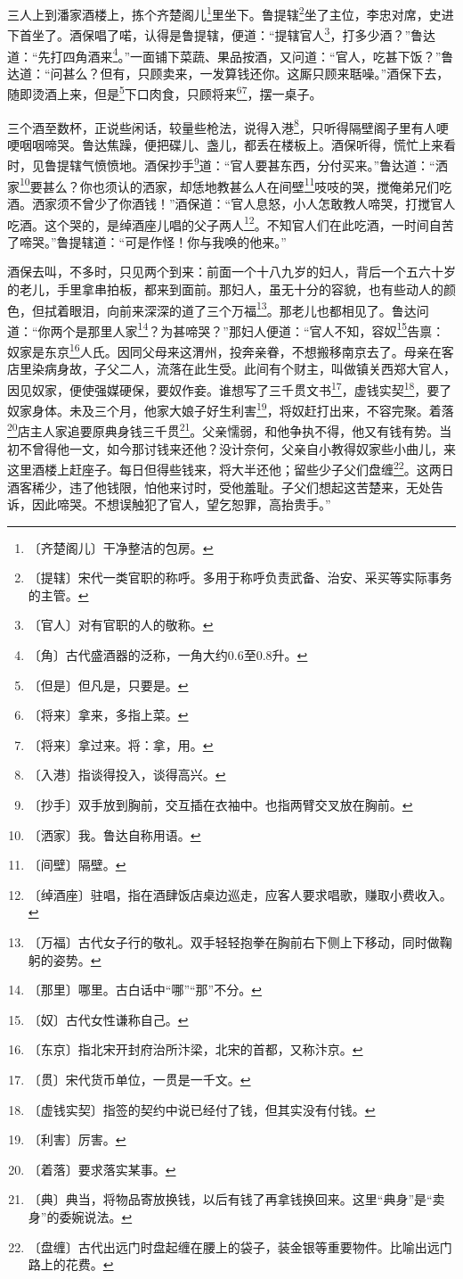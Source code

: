 \documentclass[12pt,UTF-8,openany]{ctexbook}
\begin{document}
\begin{large}
    
    三人上到潘家酒楼上，拣个齐楚阁儿\footnote{〔齐楚阁儿〕干净整洁的包房。}里坐下。鲁提辖\footnote{〔提辖〕宋代一类官职的称呼。多用于称呼负责武备、治安、采买等实际事务的主管。}坐了主位，李忠对席，史进下首坐了。酒保唱了喏，认得是鲁提辖，便道：“提辖官人\footnote{〔官人〕对有官职的人的敬称。}，打多少酒？”鲁达道：“先打四角酒来\footnote{〔角〕古代盛酒器的泛称，一角大约0.6至0.8升。}。”一面铺下菜蔬、果品按酒，又问道：“官人，吃甚下饭？”鲁达道：“问甚么？但有，只顾卖来，一发算钱还你。这厮只顾来聒噪。”酒保下去，随即烫酒上来，但是\footnote{〔但是〕但凡是，只要是。}下口肉食，只顾将来\footnote{〔将来〕拿来，多指上菜。}\footnote{〔将来〕拿过来。将：拿，用。}，摆一桌子。
    
    三个酒至数杯，正说些闲话，较量些枪法，说得入港\footnote{〔入港〕指谈得投入，谈得高兴。}，只听得隔壁阁子里有人哽哽咽咽啼哭。鲁达焦躁，便把碟儿、盏儿，都丢在楼板上。酒保听得，慌忙上来看时，见鲁提辖气愤愤地。酒保抄手\footnote{〔抄手〕双手放到胸前，交互插在衣袖中。也指两臂交叉放在胸前。}道：“官人要甚东西，分付买来。”鲁达道：“洒家\footnote{〔洒家〕我。鲁达自称用语。}要甚么？你也须认的洒家，却恁地教甚么人在间壁\footnote{〔间壁〕隔壁。}吱吱的哭，搅俺弟兄们吃酒。洒家须不曾少了你酒钱！”酒保道：“官人息怒，小人怎敢教人啼哭，打搅官人吃酒。这个哭的，是绰酒座儿唱的父子两人\footnote{〔绰酒座〕驻唱，指在酒肆饭店桌边巡走，应客人要求唱歌，赚取小费收入。}。不知官人们在此吃酒，一时间自苦了啼哭。”鲁提辖道：“可是作怪！你与我唤的他来。”
    
    酒保去叫，不多时，只见两个到来：前面一个十八九岁的妇人，背后一个五六十岁的老儿，手里拿串拍板，都来到面前。那妇人，虽无十分的容貌，也有些动人的颜色，但拭着眼泪，向前来深深的道了三个万福\footnote{〔万福〕古代女子行的敬礼。双手轻轻抱拳在胸前右下侧上下移动，同时做鞠躬的姿势。}。那老儿也都相见了。鲁达问道：“你两个是那里人家\footnote{〔那里〕哪里。古白话中“哪”“那”不分。}？为甚啼哭？”那妇人便道：“官人不知，容奴\footnote{〔奴〕古代女性谦称自己。}告禀：奴家是东京\footnote{〔东京〕指北宋开封府治所汴梁，北宋的首都，又称汴京。}人氏。因同父母来这渭州，投奔亲眷，不想搬移南京去了。母亲在客店里染病身故，子父二人，流落在此生受。此间有个财主，叫做镇关西郑大官人，因见奴家，便使强媒硬保，要奴作妾。谁想写了三千贯文书\footnote{〔贯〕宋代货币单位，一贯是一千文。}，虚钱实契\footnote{〔虚钱实契〕指签的契约中说已经付了钱，但其实没有付钱。}，要了奴家身体。未及三个月，他家大娘子好生利害\footnote{〔利害〕厉害。}，将奴赶打出来，不容完聚。着落\footnote{〔着落〕要求落实某事。}店主人家追要原典身钱三千贯\footnote{〔典〕典当，将物品寄放换钱，以后有钱了再拿钱换回来。这里“典身”是“卖身”的委婉说法。}。父亲懦弱，和他争执不得，他又有钱有势。当初不曾得他一文，如今那讨钱来还他？没计奈何，父亲自小教得奴家些小曲儿，来这里酒楼上赶座子。每日但得些钱来，将大半还他；留些少子父们盘缠\footnote{〔盘缠〕古代出远门时盘起缠在腰上的袋子，装金银等重要物件。比喻出远门路上的花费。}。这两日酒客稀少，违了他钱限，怕他来讨时，受他羞耻。子父们想起这苦楚来，无处告诉，因此啼哭。不想误触犯了官人，望乞恕罪，高抬贵手。”
    

\end{large}
\end{document}

